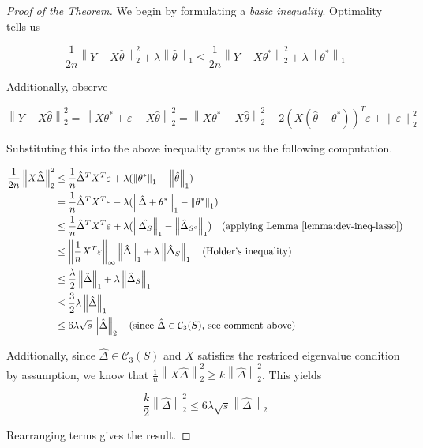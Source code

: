 \documentclass{article}
\newcommand{\cC}{\mathcal{C}}
\newcommand{\norm}[1]{\left\|#1\right\|}
\newcommand{\eps}{\varepsilon} %
\begin{document}
\begin{proof}[Proof of the Theorem]

  We begin by formulating a \textit{basic inequality}. Optimality tells us

  $$\frac{1}{2n}\norm{Y - X\hat{\theta}}_{2}^{2} + \lambda\norm{\hat{\theta}}_{1} \leq \frac{1}{2n}\norm{Y - X\theta^{*}}_{2}^{2} + \lambda\norm{\theta^{*}}_{1}$$

  Additionally, observe

  $$\norm{Y - X\hat{\theta}}_{2}^{2} = \norm{X\theta^{*} + \eps - X\hat{\theta}}_{2}^{2} = \norm{X\theta^{*} - X\hat{\theta}}_{2}^{2} - 2(X(\hat{\theta} - \theta^{*}))^{T}\eps + \norm{\eps}_{2}^{2}$$

  Substituting this into the above inequality grants us the following computation.

  \begin{align*}
    \frac{1}{2n}\norm{X\hat{\Delta}}_{2}^{2}
    &\leq \frac1n\hat{\Delta}^{T}X^{T}\eps + \lambda (\norm{\theta^{*}}_{1} - \norm{\hat{\theta}}_{1}) \\
    &= \frac1n\hat{\Delta}^{T}X^{T}\eps - \lambda (\norm{\hat{\Delta} + \theta^{*}}_{1} - \norm{\theta^{*}}_{1}) \\
    &\leq \frac1n\hat{\Delta}^{T}X^{T}\eps + \lambda(\norm{\hat{\Delta_{S}}}_{1} - \norm{\hat{\Delta}_{S^{c}}}_{1}) \quad \textrm{(applying Lemma \ref{lemma:dev-ineq-lasso})} \\
    &\leq \norm{\frac1nX^{T}\eps}_{\infty}\norm{\hat{\Delta}}_{1} + \lambda\norm{\hat{\Delta}_{S}}_{1} \quad \textrm{(Holder's inequality)} \\
    &\leq \frac{\lambda}{2}\norm{\hat{\Delta}}_{1} + \lambda\norm{\hat{\Delta}_{S}}_{1} \\
    &\leq \frac32 \lambda \norm{\hat{\Delta}}_{1} \\
    &\leq 6\lambda\sqrt{s}\norm{\hat{\Delta}}_{2} \quad \textrm{(since $\hat{\Delta} \in \cC_{3}(S)$, see comment above)}
  \end{align*}

  Additionally, since $\hat{\Delta} \in \cC_{3}(S)$ and $X$ satisfies the restriced eigenvalue condition by assumption, we know that $\frac1n\norm{X\hat{\Delta}}_{2}^{2} \geq k\norm{\hat{\Delta}}^{2}_{2}$. This yields

  $$\frac{k}{2}\norm{\hat{\Delta}}_{2}^{2} \leq 6\lambda\sqrt{s}\norm{\hat{\Delta}}_{2}$$

  Rearranging terms gives the result.

\end{proof}
\end{document}
